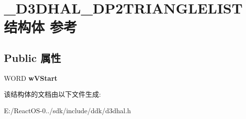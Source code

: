 \hypertarget{struct___d3_d_h_a_l___d_p2_t_r_i_a_n_g_l_e_l_i_s_t}{}\section{\+\_\+\+D3\+D\+H\+A\+L\+\_\+\+D\+P2\+T\+R\+I\+A\+N\+G\+L\+E\+L\+I\+S\+T结构体 参考}
\label{struct___d3_d_h_a_l___d_p2_t_r_i_a_n_g_l_e_l_i_s_t}
\subsection*{Public 属性}
\begin{DoxyCompactItemize}
\item 
\mbox{\label{struct___d3_d_h_a_l___d_p2_t_r_i_a_n_g_l_e_l_i_s_t_aeb1c709d92653193cf28d0d28f49f657}} 
W\+O\+RD {\bfseries w\+V\+Start}
\end{DoxyCompactItemize}


该结构体的文档由以下文件生成\+:\begin{DoxyCompactItemize}
\item 
E\+:/\+React\+O\+S-\/0../sdk/include/ddk/d3dhal.\+h\end{DoxyCompactItemize}
